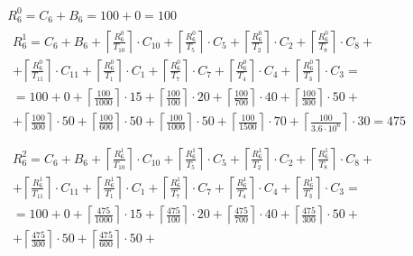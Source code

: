 \begin{gather*}
  R_6^0 = C_6 + B_6 = 100 + 0 = 100 \\
  \begin{multlined}
    R_6^1 = C_6 + B_6 + \left\lceil\frac{R_6^0}{T_{10}}\right\rceil\cdot C_{10} + %
    \left\lceil\frac{R_6^0}{T_5}\right\rceil\cdot C_5 + %
    \left\lceil\frac{R_6^0}{T_2}\right\rceil\cdot C_2 + %
    \left\lceil\frac{R_6^0}{T_8}\right\rceil\cdot C_8 + \\%
    + \left\lceil\frac{R_6^0}{T_{11}}\right\rceil\cdot C_{11} + %
    \left\lceil\frac{R_6^0}{T_1}\right\rceil\cdot C_1 +%
    \left\lceil\frac{R_6^0}{T_7}\right\rceil\cdot C_7 +%
    \left\lceil\frac{R_6^0}{T_4}\right\rceil\cdot C_4 +%
    \left\lceil\frac{R_6^0}{T_3}\right\rceil\cdot C_3 = \\%
    = 100 + 0 + \left\lceil\frac{100}{1000}\right\rceil\cdot 15 + %
    \left\lceil\frac{100}{100}\right\rceil\cdot 20 + %
    \left\lceil\frac{100}{700}\right\rceil\cdot 40 + %
    \left\lceil\frac{100}{300}\right\rceil\cdot 50 + \\%
    + \left\lceil\frac{100}{300}\right\rceil\cdot 50 + %
    \left\lceil\frac{100}{600}\right\rceil\cdot 50 + %
    \left\lceil\frac{100}{1000}\right\rceil\cdot 50 +%
    \left\lceil\frac{100}{1500}\right\rceil\cdot 70 +%
    \left\lceil\frac{100}{3.6 \cdot 10^6}\right\rceil\cdot 30 = 475 \\
  \end{multlined} \\
  \begin{multlined}
    R_6^2 = C_6 + B_6 + \left\lceil\frac{R_6^1}{T_{10}}\right\rceil\cdot C_{10} + %
    \left\lceil\frac{R_6^1}{T_5}\right\rceil\cdot C_5 + %
    \left\lceil\frac{R_6^1}{T_2}\right\rceil\cdot C_2 + %
    \left\lceil\frac{R_6^1}{T_8}\right\rceil\cdot C_8 + \\%
    + \left\lceil\frac{R_6^1}{T_{11}}\right\rceil\cdot C_{11} + %
    \left\lceil\frac{R_6^1}{T_1}\right\rceil\cdot C_1 +%
    \left\lceil\frac{R_6^1}{T_7}\right\rceil\cdot C_7 +%
    \left\lceil\frac{R_6^1}{T_4}\right\rceil\cdot C_4 +%
    \left\lceil\frac{R_6^1}{T_3}\right\rceil\cdot C_3 = \\%
    = 100 + 0 + \left\lceil\frac{475}{1000}\right\rceil\cdot 15 + %
    \left\lceil\frac{475}{100}\right\rceil\cdot 20 + %
    \left\lceil\frac{475}{700}\right\rceil\cdot 40 + %
    \left\lceil\frac{475}{300}\right\rceil\cdot 50 + \\%
    + \left\lceil\frac{475}{300}\right\rceil\cdot 50 + %
    \left\lceil\frac{475}{600}\right\rceil\cdot 50 + %

\end{multlined}
\end{gather*}
